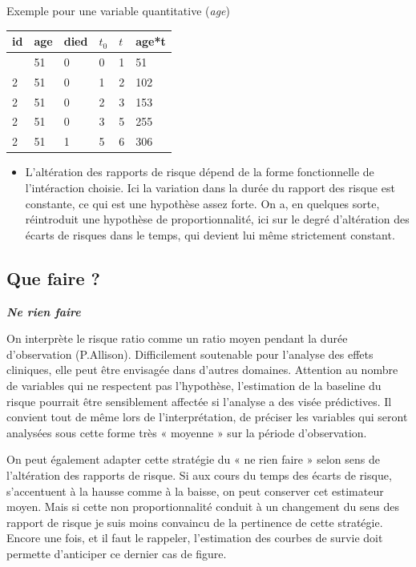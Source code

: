 \documentclass[
  12pt,
  letterpaper,
  DIV=11,
  numbers=noendperiod,
  onepage,
  openany]{scrreprt}
\providecommand{\tightlist}{%
  \setlength{\itemsep}{0pt}\setlength{\parskip}{0pt}}\usepackage{longtable,booktabs,array}
\begin{document}
Exemple pour une variable quantitative (\emph{age})

\begin{longtable}[]{@{}llllll@{}}
\toprule\noalign{}
id & age & died & \(t_0\) & \(t\) & age*t \\
\midrule\noalign{}
\endhead
\bottomrule\noalign{}
\endlastfoot
2 & 51 & 0 & 0 & 1 & 51 \\
2 & 51 & 0 & 1 & 2 & 102 \\
2 & 51 & 0 & 2 & 3 & 153 \\
2 & 51 & 0 & 3 & 5 & 255 \\
2 & 51 & 1 & 5 & 6 & 306 \\
\end{longtable}

\begin{itemize}
\tightlist
\item
  L'altération des rapports de risque dépend de la forme fonctionnelle
  de l'intéraction choisie. Ici la variation dans la durée du rapport
  des risque est constante, ce qui est une hypothèse assez forte. On a,
  en quelques sorte, réintroduit une hypothèse de proportionnalité, ici
  sur le degré d'altération des écarts de risques dans le temps, qui
  devient lui même strictement constant.
\end{itemize}

\hypertarget{que-faire}{%
\subsection{Que faire ?}\label{que-faire}}

\textbf{\emph{Ne rien faire}}

On interprète le risque ratio comme un ratio moyen pendant la durée
d'observation (P.Allison). Difficilement soutenable pour l'analyse des
effets cliniques, elle peut être envisagée dans d'autres domaines.
Attention au nombre de variables qui ne respectent pas l'hypothèse,
l'estimation de la baseline du risque pourrait être sensiblement
affectée si l'analyse a des visée prédictives. Il convient tout de même
lors de l'interprétation, de préciser les variables qui seront analysées
sous cette forme très « moyenne » sur la période d'observation.

On peut également adapter cette stratégie du « ne rien faire » selon
sens de l'altération des rapports de risque. Si aux cours du temps des
écarts de risque, s'accentuent à la hausse comme à la baisse, on peut
conserver cet estimateur moyen. Mais si cette non proportionnalité
conduit à un changement du sens des rapport de risque je suis moins
convaincu de la pertinence de cette stratégie. Encore une fois, et il
faut le rappeler, l'estimation des courbes de survie doit permette
d'anticiper ce dernier cas de figure.
\end{document}
